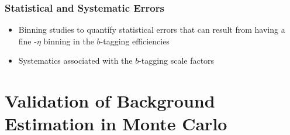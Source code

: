 \subsubsection{Statistical and Systematic Errors}
\begin{itemize}
    \item Binning studies to quantify statistical errors that can result from having a fine \pt-$\eta$ binning in the $b$-tagging efficiencies
    \item Systematics associated with the $b$-tagging scale factors
\end{itemize}




\section{Validation of Background Estimation in Monte Carlo}



















%
%


